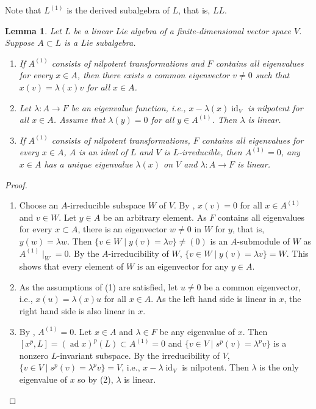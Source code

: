 \documentclass[12pt,MSc]{muthesis_2023}
\theoremstyle{plain}%
\newtheorem{Lemma}[FactCounter]{Lemma} %
\theoremstyle{definition}
\theoremstyle{remark}
\DeclareMathOperator{\ad}{ad}
\DeclareMathOperator{\id}{id}
\begin{document}
Note that $L^{(1)}$ is the derived subalgebra of $L$, that is, $LL$.

\begin{Lemma}\label{derivedsubalgebraandlinear}
Let $L$ be a linear Lie algebra of a finite-dimensional vector space $V$. Suppose $A\subset L$ is a Lie subalgebra.

\begin{enumerate}
\item[(1)]
If $A^{(1)}$ consists of nilpotent transformations and $F$ contains all eigenvalues for every $x\in A$, then there exists a common eigenvector $v\neq0$ such that $x(v)=\lambda(x)v$ for all $x\in A$.

\item[(2)]
Let $\lambda:A\rightarrow F$ be an eigenvalue function, i.e., $x-\lambda(x)\id_V$ is nilpotent for all $x\in A$. Assume that $\lambda(y)=0$ for all $y\in A^{(1)}$. Then $\lambda$ is linear.

\item[(3)]
If $A^{(1)}$ consists of nilpotent transformations, $F$ contains all eigenvalues for every $x\in A$, $A$ is an ideal of $L$ and $V$ is $L$-irreducible, then $A^{(1)}=0$, any $x\in A$ has a unique eigenvalue $\lambda(x)$ on $V$ and $\lambda:A \rightarrow F$ is linear.

\end{enumerate}
\end{Lemma}

\begin{proof}
\begin{enumerate}
\item[(1)]
Choose an $A$-irreducible subspace $W$ of $V$. By    , $x(v)=0$ for all $x\in A^{(1)}$ and $v\in W$. Let $y\in A$ be an arbitrary element. As $F$ contains all eigenvalues for every $x\subset A$, there is an eigenvector $w\neq 0$ in $W$ for $y$, that is, $y(w)=\lambda w$. Then $\{v\in W \mid y(v)=\lambda v\}\neq (0)$ is an $A$-submodule of $W$ as $A^{(1)}\mid_W=0$. By the $A$-irreducibility of $W$, $\{v\in W \mid y(v)=\lambda v\}=W$. This shows that every element of $W$ is an eigenvector for any $y\in A$.

\item[(2)]
As the assumptions of (1) are satisfied, let $u\neq 0$ be a common eigenvector, i.e., $x(u)=\lambda(x)u$ for all $x\in A$. As the left hand side is linear in $x$, the right hand side is also linear in $x$.

\item[(3)]
By   , $A^{(1)}=0$. Let $x\in A$ and $\lambda \in F$ be any eigenvalue of $x$. Then $[x^p, L]={(\ad x)}^p(L) \subset A^{(1)}=0$ and $\{v\in V \mid s^p(v)=\lambda^p v \}$ is a nonzero $L$-invariant subspace. By the irreducibility of $V$, $\{v\in V \mid s^p(v)=\lambda^p v \}=V$, i.e., $x-\lambda\id_V$ is nilpotent. Then $\lambda$ is the only eigenvalue of $x$ so by (2), $\lambda$ is linear.
\end{enumerate}
\end{proof}
\end{document}
